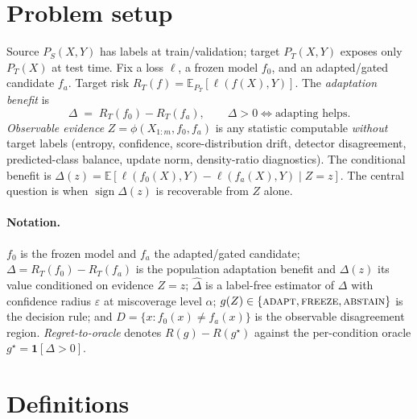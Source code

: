 \documentclass[conference]{IEEEtran}
\theoremstyle{plain}
\theoremstyle{definition}
\newcommand{\E}{\mathbb{E}}
\newcommand{\sign}{\operatorname{sign}}
\begin{document}
\section{Problem setup}\label{sec:setup}
Source $P_S(X,Y)$ has labels at train/validation; target $P_T(X,Y)$ exposes only
$P_T(X)$ at test time. Fix a loss $\ell$, a frozen model $f_0$, and an
adapted/gated candidate $f_a$. Target risk $R_T(f)=\E_{P_T}[\ell(f(X),Y)]$.
The \emph{adaptation benefit} is
\begin{equation}
\Delta \;=\; R_T(f_0)-R_T(f_a),\qquad \Delta>0 \iff \text{adapting helps.}
\end{equation}
\emph{Observable evidence} $Z=\phi(X_{1:m},f_0,f_a)$ is any statistic computable
\emph{without} target labels (entropy, confidence, score-distribution drift,
detector disagreement, predicted-class balance, update norm, density-ratio
diagnostics). The conditional benefit is $\Delta(z)=\E[\ell(f_0(X),Y)-\ell(f_a(X),Y)\mid Z=z]$.
The central question is when $\sign\Delta(z)$ is recoverable from $Z$ alone.

\paragraph{Notation.} $f_0$ is the frozen model and $f_a$ the adapted/gated candidate;
$\Delta=R_T(f_0)-R_T(f_a)$ is the population adaptation benefit and $\Delta(z)$ its value
conditioned on evidence $Z{=}z$; $\widehat\Delta$ is a label-free estimator of $\Delta$ with
confidence radius $\varepsilon$ at miscoverage level $\alpha$; $g(Z)\in\{\textsc{adapt},
\textsc{freeze},\textsc{abstain}\}$ is the decision rule; and $D=\{x:f_0(x)\neq f_a(x)\}$ is the
observable disagreement region. \emph{Regret-to-oracle} denotes $R(g)-R(g^\star)$ against the
per-condition oracle $g^\star=\mathbf1[\Delta>0]$.

\section{Definitions}\label{sec:def}

\end{document}
